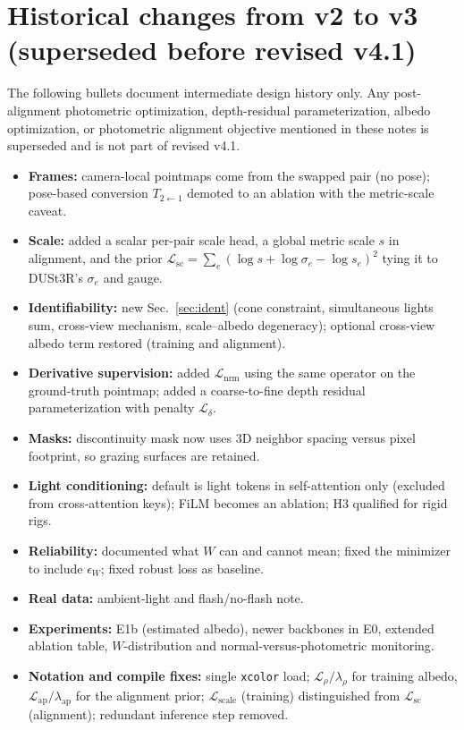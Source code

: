 \documentclass[11pt,a4paper]{article}
\newcommand{\Loss}{\mathcal{L}}
\begin{document}
\section{Historical changes from v2 to v3 (superseded before revised v4.1)}

The following bullets document intermediate design history only. Any
post-alignment photometric optimization, depth-residual parameterization,
albedo optimization, or photometric alignment objective mentioned in these
notes is superseded and is not part of revised v4.1.

\begin{itemize}
  \item \textbf{Frames:} camera-local pointmaps come from the swapped pair
  (no pose); pose-based conversion $T_{2\leftarrow1}$ demoted to an ablation
  with the metric-scale caveat.
  \item \textbf{Scale:} added a scalar per-pair scale head, a global metric
  scale $s$ in alignment, and the prior
  $\Loss_{\mathrm{sc}}=\sum_e(\log s+\log\sigma_e-\log s_e)^2$ tying it to
  DUSt3R's $\sigma_e$ and gauge.
  \item \textbf{Identifiability:} new Sec.~\ref{sec:ident} (cone constraint,
  simultaneous lights sum, cross-view mechanism, scale--albedo degeneracy);
  optional cross-view albedo term restored (training and alignment).
  \item \textbf{Derivative supervision:} added $\Loss_{\mathrm{nrm}}$ using
  the same operator on the ground-truth pointmap; added a coarse-to-fine
  depth residual parameterization with penalty $\Loss_\delta$.
  \item \textbf{Masks:} discontinuity mask now uses 3D neighbor spacing
  versus pixel footprint, so grazing surfaces are retained.
  \item \textbf{Light conditioning:} default is light tokens in
  self-attention only (excluded from cross-attention keys); FiLM becomes an
  ablation; H3 qualified for rigid rigs.
  \item \textbf{Reliability:} documented what $W$ can and cannot mean; fixed
  the minimizer to include $\epsilon_W$; fixed robust loss as baseline.
  \item \textbf{Real data:} ambient-light and flash/no-flash note.
  \item \textbf{Experiments:} E1b (estimated albedo), newer backbones in E0,
  extended ablation table, $W$-distribution and normal-versus-photometric
  monitoring.
  \item \textbf{Notation and compile fixes:} single \texttt{xcolor} load;
  $\Loss_\rho/\lambda_\rho$ for training albedo, $\Loss_{\mathrm{ap}}/\lambda_{\mathrm{ap}}$
  for the alignment prior; $\Loss_{\mathrm{scale}}$ (training) distinguished from
  $\Loss_{\mathrm{sc}}$ (alignment); redundant inference step removed.
\end{itemize}
\end{document}
